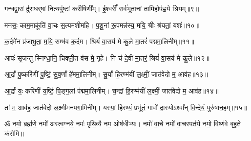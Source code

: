 ग॒न्ध॒द्वा॒रां दु॑राध॒र्॒‌षां॒ नि॒त्यपु॑ष्टां करी॒षिणी᳚म्।
ई॒श्वरीं᳚ सर्व॑भूता॒नां॒ तामि॒होप॑ह्वये॒ श्रियम्॥९॥

मन॑सः॒ काम॒माकू॑तिं वा॒चः स॒त्यम॑शीमहि।
प॒शू॒नां रू॒पमन्न॑स्य॒ मयि॒ श्रीः श्र॑यतां॒ यशः॑॥१०॥

क॒र्दमे॑न प्र॑जाभू॒ता॒ म॒यि॒ सम्भ॑व क॒र्दम।
श्रियं॑ वा॒सय॑ मे कु॒ले मा॒तरं॑ पद्ममा॒लिनीम्॥११॥

आपः॑ सृ॒जन्तु॑ स्निग्धा॒नि॒ चिक्ली॒त व॑स मे॒ गृहे।
नि च॑ दे॒वीं मा॒तरं॒ श्रियं॑ वा॒सय॑ मे कु॒ले॥१२॥

आ॒र्द्रां पु॒ष्करि॑णीं पु॒ष्टिं॒ सु॒व॒र्णां हे॑ममा॒लिनीम्।
सू॒र्यां हि॒रण्म॑यीं ल॒क्ष्मीं॒ जात॑वेदो म॒ आव॑ह॥१३॥

आ॒र्द्रां यः॒ करि॑णीं य॒ष्टिं॒ पि॒ङ्ग॒लां प॑द्ममा॒लिनीम्।
च॒न्द्रां हि॒रण्म॑यीं ल॒क्ष्मीं॒ जात॑वेदो म॒ आव॑ह॥१४॥

तां म॒ आव॑ह॒ जात॑वेदो ल॒क्ष्मीमन॑पगा॒मिनी᳚म्।
यस्यां॒ हि॑रण्यं॒ प्रभू॑तं॒ गावो॑ दा॒स्योऽश्वा᳚न् वि॒न्देयं॒ पुरु॑षान॒हम्॥१५॥


ॐ नमो॒ ब्रह्म॑णे॒ नमो॑ अस्त्व॒ग्नये॒ नमः॑ पृथि॒व्यै नम॒ ओष॑धीभ्यः।
नमो॑ वा॒चे नमो॑ वा॒चस्पत॑ये॒ नमो॒ विष्ण॑वे बृह॒ते क॑रोमि॥


\closesection
